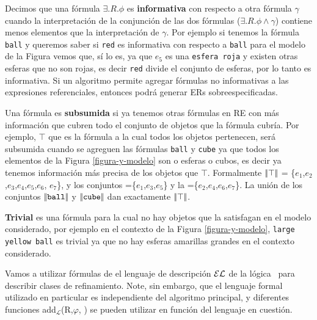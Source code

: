 Decimos que una f\'ormula $\exists.R. \phi$ es \textbf{informativa} con respecto a otra f\'ormula $\gamma$ cuando la interpretaci\'on de la conjunci\'on de las dos f\'ormulas ($\exists.R. \phi \land \gamma$) contiene menos elementos que la interpretaci\'on de $\gamma$. Por ejemplo si tenemos la f\'ormula \texttt{ball} y 
queremos saber si \texttt{red} es informativa con respecto a \texttt{ball} para el modelo de la Figura vemos que, s\'i lo es, ya que $e_5$ es una \texttt{esfera roja} y existen otras esferas que no son rojas,
 es decir \texttt{red} divide el conjunto de esferas, por lo tanto es informativa. Si un algoritmo permite agregar f\'ormulas no informativas a las expresiones referenciales, entonces podr\'a generar ERs sobreespecificadas.

Una f\'ormula es \textbf{subsumida} si ya tenemos otras f\'ormulas en RE con m\'as informaci\'on que cubren todo el conjunto de objetos que 
la f\'ormula cubr\'ia. Por ejemplo, $\top$ que es la f\'ormula a la cual todos los objetos pertenecen, ser\'a subsumida cuando se agreguen 
las f\'ormulas \texttt{ball} y \texttt{cube} ya que todos los elementos de la Figura \ref{figura-y-modelo} son o esferas o cubos, 
es decir ya tenemos informaci\'on m\'as precisa de los objetos que $\top$. Formalmente $|\!|\top|\!|$ = \{$e_1$,$e_2$,$e_3$,$e_4$,$e_5$,$e_6$, $e_7$\}, y los conjuntos =\{$e_1$,$e_3$,$e_5$\} y la =\{$e_2$,$e_4$,$e_6$,$e_7$\}. La uni\'on de los conjuntos $|\!|\texttt{ball}|\!|$ y $|\!|\texttt{cube}|\!|$ dan exactamente $|\!|\top|\!|$.


\textbf{Trivial} es una f\'ormula para la cual no hay objetos que la satisfagan en el modelo considerado, por ejemplo en el contexto de la 
Figura \ref{figura-y-modelo}, \texttt{large yellow ball} es trivial ya que no hay esferas amarillas grandes en el contexto considerado.

Vamos a utilizar f\'ormulas de el lenguaje de descripci\'on $\mathcal{EL}$ de la l\'ogica~\cite{baader03} para describir clases de refinamiento.
Note, sin embargo, que el lenguaje formal utilizado en particular es independiente del algoritmo principal, y diferentes 
funciones add$_{\mathcal {L}}$(R,$\varphi $, \RE) se pueden utilizar en funci\'on del lenguaje en cuesti\'on.


